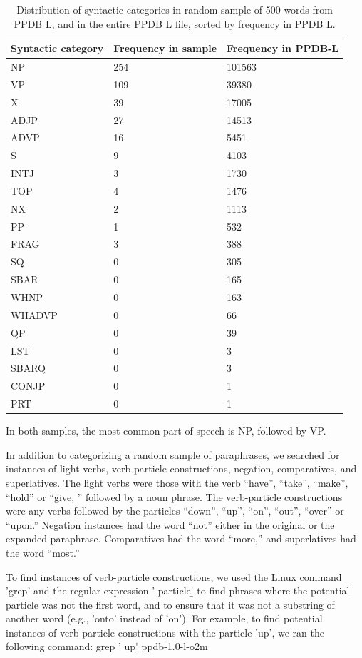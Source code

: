 \documentclass[11pt]{article}
\begin{document}
\begin{table}[h]
\begin{center}
\begin{tabular}{|l|l|l|}
\hline \bf Syntactic category & \bf Frequency in sample & \bf Frequency in PPDB-L \\ \hline
NP & 254 & 101563 \\
VP & 109 & 39380 \\
X & 39 & 17005 \\
ADJP & 27 & 14513 \\
ADVP & 16 & 5451 \\
S & 9 & 4103 \\
INTJ & 3 & 1730 \\
TOP & 4 & 1476 \\
NX & 2 & 1113 \\
PP & 1 & 532 \\
FRAG & 3 & 388  \\ 
SQ & 0 & 305 \\
SBAR & 0 & 165 \\
WHNP & 0 & 163 \\
WHADVP & 0 & 66 \\
QP & 0 & 39 \\
LST & 0 & 3 \\ 
SBARQ & 0 & 3 \\
CONJP & 0 & 1 \\
PRT & 0 & 1 \\
\hline
\end{tabular}
\end{center}
\caption{\label{sc-dist} Distribution of syntactic categories in random sample of 500 words from PPDB L, and in the entire PPDB L file, sorted by frequency in PPDB L. }
\end{table}

In both samples, the most common part of speech is NP, followed by VP. 

In addition to categorizing a random sample of paraphrases, we searched for instances of light verbs, verb-particle constructions, negation, comparatives, and superlatives. The light verbs were those with the verb “have”, “take”, “make”, “hold” or “give, ” followed by a noun phrase. The verb-particle constructions were any verbs followed by the particles “down”, “up”, “on”, “out”, “over” or “upon.” Negation instances had the word “not” either in the original or the expanded paraphrase. Comparatives had the word “more,” and superlatives had the word “most.”

To find instances of verb-particle constructions, we used the Linux command 'grep' and the regular expression ' particle\b' to find phrases where the potential particle was not the first word, and to ensure that it was not a substring of another word (e.g., 'onto' instead of 'on'). For example, to find potential instances of verb-particle constructions with the particle 'up', we ran the following command:
grep ' up\b' ppdb-1.0-l-o2m
\end{document}
